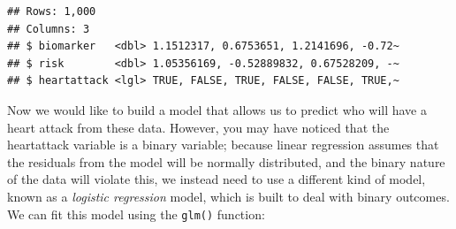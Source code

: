 \documentclass[
  12pt,
]{book}
\newenvironment{Shaded}{\begin{snugshade}}{\end{snugshade}}
\newcommand{\AttributeTok}[1]{\textcolor[rgb]{0.13,0.29,0.53}{#1}}
\newcommand{\CommentTok}[1]{\textcolor[rgb]{0.56,0.35,0.01}{\textit{#1}}}
\newcommand{\DecValTok}[1]{\textcolor[rgb]{0.00,0.00,0.81}{#1}}
\newcommand{\FloatTok}[1]{\textcolor[rgb]{0.00,0.00,0.81}{#1}}
\newcommand{\FunctionTok}[1]{\textcolor[rgb]{0.13,0.29,0.53}{\textbf{#1}}}
\newcommand{\NormalTok}[1]{#1}
\newcommand{\OtherTok}[1]{\textcolor[rgb]{0.56,0.35,0.01}{#1}}
\newcommand{\SpecialCharTok}[1]{\textcolor[rgb]{0.81,0.36,0.00}{\textbf{#1}}}
\begin{document}
\begin{Shaded}
\end{Shaded}

\begin{verbatim}
## Rows: 1,000
## Columns: 3
## $ biomarker   <dbl> 1.1512317, 0.6753651, 1.2141696, -0.72~
## $ risk        <dbl> 1.05356169, -0.52889832, 0.67528209, -~
## $ heartattack <lgl> TRUE, FALSE, TRUE, FALSE, FALSE, TRUE,~
\end{verbatim}

Now we would like to build a model that allows us to predict who will have a heart attack from these data. However, you may have noticed that the heartattack variable is a binary variable; because linear regression assumes that the residuals from the model will be normally distributed, and the binary nature of the data will violate this, we instead need to use a different kind of model, known as a \emph{logistic regression} model, which is built to deal with binary outcomes. We can fit this model using the \texttt{glm()} function:
\end{document}
